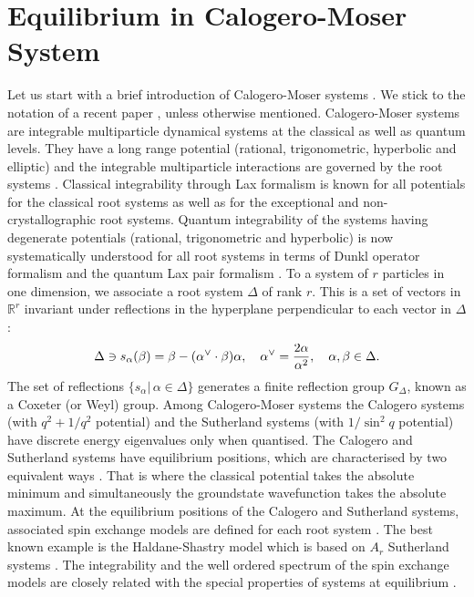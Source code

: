 \documentclass[a4paper,12pt]{article}
\begin{document}
\section{Equilibrium in Calogero-Moser System}
\label{calmo}
\setcounter{equation}{0}

Let us start with a brief introduction of
Calogero-Moser systems \cite{Cal,Sut,CalMo}.
We stick to the notation of a recent paper \cite{cs},
unless otherwise mentioned.
Calogero-Moser systems are integrable multiparticle dynamical systems
at the classical as well as  quantum levels.
They have a long range potential (rational, trigonometric,
hyperbolic and elliptic) and the integrable multiparticle interactions
are governed by the root systems \cite{OP1}.
Classical integrability through Lax formalism is known for all potentials
for the classical root systems \cite{OP1} as well as for the exceptional
\cite{DHoker_Phong,bcs2} and non-crystallographic \cite{bcs2} root systems.
Quantum integrability of the systems having degenerate potentials
(rational, trigonometric and hyperbolic) is now systematically understood
for all root systems in terms of Dunkl operator formalism \cite{Dunk,HeOp}
and the quantum Lax pair formalism \cite{bms,kps}.
To a system of $r$ particles in one dimension, we associate a root system
$\Delta$  of rank \(r\). This is a set of vectors in \(\mathbb{R}^{r}\)
invariant under reflections in the hyperplane perpendicular to each
vector in $\Delta$:
\begin{equation}
   \Delta\ni s_{\alpha}(\beta)=\beta-(\alpha^{\vee}\cdot\beta)\alpha,
   \quad \alpha^{\vee}={2\alpha\over{\alpha^2}},
   \quad \alpha, \beta\in\Delta.
   \label{a1}
\end{equation}
The set of reflections $\{s_{\alpha}|\,\alpha\in\Delta\}$ generates a
finite reflection group $G_{\Delta}$, known as a Coxeter (or Weyl) group.
Among Calogero-Moser systems the Calogero systems (with $q^2+1/q^2$
potential) and the Sutherland systems (with $1/\sin^2\!q$ potential) have
discrete energy eigenvalues only when quantised.
The Calogero and Sutherland systems have equilibrium positions,
which are characterised by two equivalent ways \cite{cs}. That is where
the classical potential takes the absolute minimum and simultaneously
the groundstate wavefunction takes the absolute maximum.
At the equilibrium positions of the Calogero and Sutherland systems,
associated spin exchange models are defined for each root system \cite{is1}.
The best known example is  the Haldane-Shastry model which is based on
$A_r$ Sutherland systems \cite{halsha}.
The integrability and the well ordered spectrum of the spin exchange
models are closely related with the special properties of
systems at equilibrium \cite{cs}.
\end{document}
